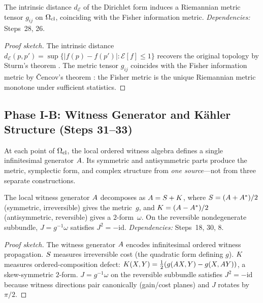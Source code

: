 \begin{theorem}
\label{thm:riemannian-metric}
The intrinsic distance $d_{\mathcal{E}}$ of the Dirichlet form induces a
Riemannian metric tensor $g_{ij}$ on $\Omega_{\mathrm{cl}}$, coinciding with the
Fisher information metric.
\emph{Dependencies:} Steps~28, 26.
\begin{proof}[Proof sketch]
The intrinsic distance
$d_{\mathcal{E}}(p, p') = \sup\{|f(p) - f(p')| : \mathcal{E}[f] \leq 1\}$
recovers the original topology by Sturm's theorem \citep{sturm1994}.  The
metric tensor $g_{ij}$ coincides with the Fisher information metric by
\v{C}encov's theorem \citep{cencov1982}: the Fisher metric is the unique
Riemannian metric monotone under sufficient statistics.
\end{proof}
\end{theorem}

\subsection{Phase I-B: Witness Generator and K\"{a}hler Structure (Steps 31--33)}
\label{sec:derivation:geometry-nc}

\begin{remark}
\label{rem:single-generator}
At each point of $\Omega_{\mathrm{cl}}$, the local ordered witness algebra defines a
single infinitesimal generator $A$.  Its symmetric and antisymmetric
parts produce the metric, symplectic form, and complex structure from
\emph{one source}---not from three separate constructions.
\end{remark}

\begin{theorem}
\label{thm:complex-structure}
The local witness generator $A$ decomposes as
$A = S + K$, where
$S = (A + A^*)/2$ (symmetric, irreversible) gives the
metric~$g$, and $K = (A - A^*)/2$ (antisymmetric,
reversible) gives a $2$-form~$\omega$.  On the reversible nondegenerate
subbundle, $J = g^{-1}\omega$ satisfies $J^2 = -\mathrm{id}$.
\emph{Dependencies:} Steps~18, 30, 8.
\begin{proof}[Proof sketch]
The witness generator $A$ encodes infinitesimal ordered witness
propagation.  $S$ measures irreversible cost (the quadratic form
defining $g$).  $K$ measures ordered-composition defect:
$K(X, Y) = \frac{1}{2}(g(A X, Y) - g(X, A Y))$,
a skew-symmetric $2$-form.  $J = g^{-1}\omega$ on the reversible
subbundle satisfies $J^2 = -\mathrm{id}$ because witness directions
pair canonically (gain/cost planes) and $J$ rotates by $\pi/2$.
\end{proof}
\end{theorem}

